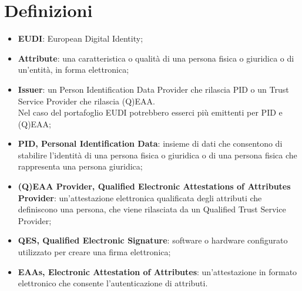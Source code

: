 \section{Definizioni}
\begin{itemize}
    \item \textbf{EUDI}: European Digital Identity;
    \item \textbf{Attribute}: una caratteristica o qualità di una persona fisica o giuridica o di un'entità, in forma elettronica;
    \item \textbf{Issuer}: un Person Identification Data Provider che rilascia PID o un Trust Service Provider che rilascia (Q)EAA.
    \\Nel caso del portafoglio EUDI potrebbero esserci più emittenti per PID e (Q)EAA;
    \item \textbf{PID, Personal Identification Data}: insieme di dati che consentono di stabilire l'identità di una persona fisica o giuridica o di una persona fisica che rappresenta una persona giuridica;
    \item \textbf{(Q)EAA Provider, Qualified Electronic Attestations of Attributes Provider}: un'attestazione elettronica qualificata degli attributi che definiscono una persona, che viene rilasciata da un Qualified Trust Service Provider;
    \item \textbf{QES, Qualified Electronic Signature}: software o hardware configurato utilizzato per creare una firma elettronica;
    \item \textbf{EAAs, Electronic Attestation of Attributes}: un'attestazione in formato elettronico che consente l'autenticazione di attributi.
\end{itemize}






